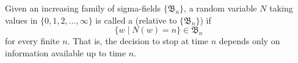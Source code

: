 Given an increasing family of sigma-fields $\{\mathfrak{B}_n\}$, a random variable $N$ taking values in $\{0, 1, 2, \ldots, \infty\}$ is called a  (relative to $\{\mathfrak{B}_n\}$) if
$$\{w \mid N(w) = n\} \in \mathfrak{B}_n$$
for every finite $n$. That is, the decision to stop at time $n$ depends only on information available up to time $n$.
